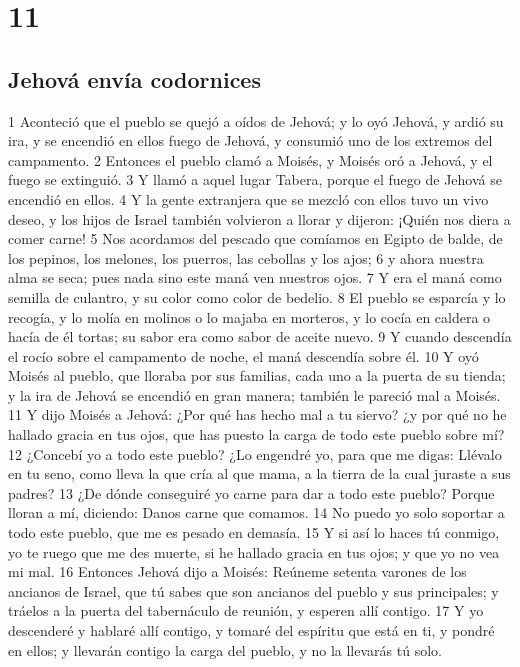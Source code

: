 \chapter{11}

\section*{Jehová envía codornices}

1 Aconteció que el pueblo se quejó a oídos de Jehová; y lo oyó Jehová, y ardió su ira, y se encendió en ellos fuego de Jehová, y consumió uno de los extremos del campamento.
2 Entonces el pueblo clamó a Moisés, y Moisés oró a Jehová, y el fuego se extinguió.
3 Y llamó a aquel lugar Tabera, porque el fuego de Jehová se encendió en ellos.
4 Y la gente extranjera que se mezcló con ellos tuvo un vivo deseo, y los hijos de Israel también volvieron a llorar y dijeron: ¡Quién nos diera a comer carne!
5 Nos acordamos del pescado que comíamos en Egipto de balde, de los pepinos, los melones, los puerros, las cebollas y los ajos;
6 y ahora nuestra alma se seca; pues nada sino este maná ven nuestros ojos.
7 Y era el maná como semilla de culantro, y su color como color de bedelio.
8 El pueblo se esparcía y lo recogía, y lo molía en molinos o lo majaba en morteros, y lo cocía en caldera o hacía de él tortas; su sabor era como sabor de aceite nuevo.
9 Y cuando descendía el rocío sobre el campamento de noche, el maná descendía sobre él.
10 Y oyó Moisés al pueblo, que lloraba por sus familias, cada uno a la puerta de su tienda; y la ira de Jehová se encendió en gran manera; también le pareció mal a Moisés.
11 Y dijo Moisés a Jehová: ¿Por qué has hecho mal a tu siervo? ¿y por qué no he hallado gracia en tus ojos, que has puesto la carga de todo este pueblo sobre mí?
12 ¿Concebí yo a todo este pueblo? ¿Lo engendré yo, para que me digas: Llévalo en tu seno, como lleva la que cría al que mama, a la tierra de la cual juraste a sus padres?
13 ¿De dónde conseguiré yo carne para dar a todo este pueblo? Porque lloran a mí, diciendo: Danos carne que comamos.
14 No puedo yo solo soportar a todo este pueblo, que me es pesado en demasía.
15 Y si así lo haces tú conmigo, yo te ruego que me des muerte, si he hallado gracia en tus ojos; y que yo no vea mi mal.
16 Entonces Jehová dijo a Moisés: Reúneme setenta varones de los ancianos de Israel, que tú sabes que son ancianos del pueblo y sus principales; y tráelos a la puerta del tabernáculo de reunión, y esperen allí contigo.
17 Y yo descenderé y hablaré allí contigo, y tomaré del espíritu que está en ti, y pondré en ellos; y llevarán contigo la carga del pueblo, y no la llevarás tú solo.
